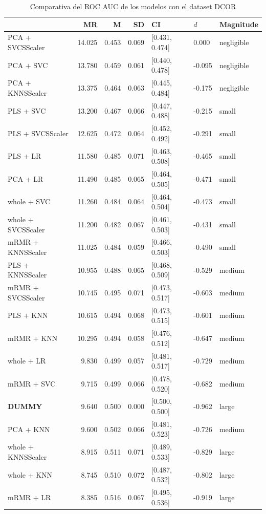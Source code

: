 \documentclass[a4paper,oneside,11pt,leqno]{article}
\begin{document}
	\begin{table}[h]
		\centering
		\begin{tabular}{lrrrlll}
			\toprule
			{} &     MR &     M &    SD &              CI &    $d$ &   Magnitude \\
			\midrule
			PCA + SVCSScaler   & 14.025 & 0.453 & 0.069 &  [0.431, 0.474] &  0.000 &  negligible \\
			PCA + SVC          & 13.780 & 0.459 & 0.061 &  [0.440, 0.478] & -0.095 &  negligible \\
			PCA + KNNSScaler   & 13.375 & 0.464 & 0.063 &  [0.445, 0.484] & -0.175 &  negligible \\
			PLS + SVC          & 13.200 & 0.467 & 0.066 &  [0.447, 0.488] & -0.215 &       small \\
			PLS + SVCSScaler   & 12.625 & 0.472 & 0.064 &  [0.452, 0.492] & -0.291 &       small \\
			PLS + LR           & 11.580 & 0.485 & 0.071 &  [0.463, 0.508] & -0.465 &       small \\
			PCA + LR           & 11.490 & 0.485 & 0.065 &  [0.464, 0.505] & -0.471 &       small \\
			whole + SVC        & 11.260 & 0.484 & 0.064 &  [0.464, 0.504] & -0.473 &       small \\
			whole + SVCSScaler & 11.200 & 0.482 & 0.067 &  [0.461, 0.503] & -0.431 &       small \\
			mRMR + KNNSScaler  & 11.025 & 0.484 & 0.059 &  [0.466, 0.503] & -0.490 &       small \\
			PLS + KNNSScaler   & 10.955 & 0.488 & 0.065 &  [0.468, 0.509] & -0.529 &      medium \\
			mRMR + SVCSScaler  & 10.745 & 0.495 & 0.071 &  [0.473, 0.517] & -0.603 &      medium \\
			PLS + KNN          & 10.615 & 0.494 & 0.068 &  [0.473, 0.515] & -0.601 &      medium \\
			mRMR + KNN         & 10.295 & 0.494 & 0.058 &  [0.476, 0.512] & -0.647 &      medium \\
			whole + LR         &  9.830 & 0.499 & 0.057 &  [0.481, 0.517] & -0.729 &      medium \\
			mRMR + SVC         &  9.715 & 0.499 & 0.066 &  [0.478, 0.520] & -0.682 &      medium \\
			 \textbf{DUMMY}              &  9.640 & 0.500 & 0.000 &  [0.500, 0.500] & -0.962 &       large \\
			PCA + KNN          &  9.600 & 0.502 & 0.066 &  [0.481, 0.523] & -0.726 &      medium \\
			whole + KNNSScaler &  8.915 & 0.511 & 0.071 &  [0.489, 0.533] & -0.829 &       large \\
			whole + KNN        &  8.745 & 0.510 & 0.072 &  [0.487, 0.532] & -0.802 &       large \\
			mRMR + LR          &  8.385 & 0.516 & 0.067 &  [0.495, 0.536] & -0.919 &       large \\
			\bottomrule
		\end{tabular}
			\caption{Comparativa del ROC AUC de los modelos con el dataset DCOR}
			\label{tab:stat_results_dcor}
	\end{table}
	
\end{document}
